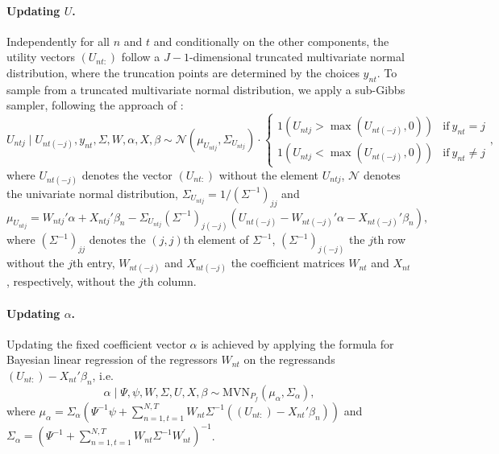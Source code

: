 \documentclass[article]{jss}
\newcommand{\MVN}[1]{\text{MVN}_{#1}}
\begin{document}
\paragraph{Updating $U$.} Independently for all $n$ and $t$ and conditionally on the other components, the utility vectors $(U_{nt:})$ follow a $J-1$-dimensional truncated multivariate normal distribution, where the truncation points are determined by the choices $y_{nt}$. To sample from a truncated multivariate normal distribution, we apply a sub-Gibbs sampler, following the approach of \cite{Geweke:98}:
\begin{equation}
U_{ntj} \mid U_{nt(-j)},y_{nt},\Sigma,W,\alpha,X,\beta
\sim \mathcal{N}(\mu_{U_{ntj}},\Sigma_{U_{ntj}}) \cdot \begin{cases}
1(U_{ntj}>\max(U_{nt(-j)},0) ) & \text{if}~ y_{nt}=j\\
1(U_{ntj}<\max(U_{nt(-j)},0) ) & \text{if}~ y_{nt}\neq j
\end{cases},
\end{equation}
where $U_{nt(-j)}$ denotes the vector $(U_{nt:})$ without the element $U_{ntj}$, $\mathcal{N}$ denotes the univariate normal distribution, $\Sigma_{U_{ntj}} = 1/(\Sigma^{-1})_{jj}$ and
\begin{equation}
\mu_{U_{ntj}} = W_{ntj}'\alpha + X_{ntj}'\beta_n - \Sigma_{U_{ntj}} (\Sigma^{-1})_{j(-j)}   (U_{nt(-j)} - W_{nt(-j)}'\alpha - X_{nt(-j)}' \beta_n ),
\end{equation}
where $(\Sigma^{-1})_{jj}$ denotes the $(j,j)$th element of $\Sigma^{-1}$, $(\Sigma^{-1})_{j(-j)}$ the $j$th row without the $j$th entry, $W_{nt(-j)}$ and $X_{nt(-j)}$ the coefficient matrices $W_{nt}$ and $X_{nt}$, respectively, without the $j$th column.

\paragraph{Updating $\alpha$.} Updating the fixed coefficient vector $\alpha$ is achieved by applying the formula for Bayesian linear regression of the regressors $W_{nt}$ on the regressands $(U_{nt:})-X_{nt}'\beta_n$, i.e.
\begin{equation}
\alpha \mid \Psi,\psi,W,\Sigma,U,X,\beta \sim \MVN{P_f}(\mu_\alpha,\Sigma_\alpha),
\end{equation}
where $\mu_\alpha = \Sigma_\alpha (\Psi^{-1}\psi + \sum_{n=1,t=1}^{N,T} W_{nt} \Sigma^{-1} ((U_{nt:})-X_{nt}'\beta_n) )$ and $\Sigma_\alpha = (\Psi^{-1} + \sum_{n=1,t=1}^{N,T} W_{nt}\Sigma^{-1} W_{nt}^{'} )^{-1}$.
\end{document}
